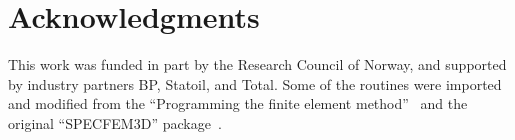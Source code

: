 \chapter*{Acknowledgments}
This work was funded in part by the Research Council of Norway,
and supported by industry partners BP, Statoil, and Total. Some of the routines were imported and modified from the ``Programming the finite element method''~\citep{smith2004} and the original ``SPECFEM3D'' package~\citep[e.g.,][]{komatitsch1998,komatitsch1999,peter2011}.

\clearpage
